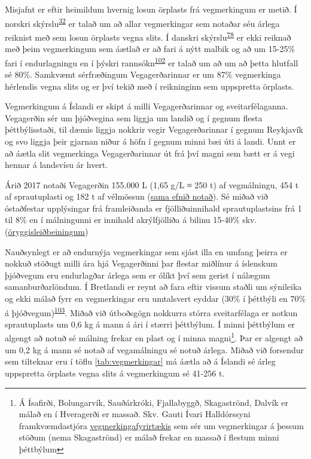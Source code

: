 \documentclass[icelandic,]{book}
\let\rmarkdownfootnote\footnote%
\def\footnote{\protect\rmarkdownfootnote}
\begin{document}
Misjafnt er eftir heimildum hvernig losun örplasts frá vegmerkingum er metið. Í norskri skýrslu\textsuperscript{\protect\hyperlink{ref-sundt2014sources}{32}} er talað um að allar vegmerkingar sem notaðar séu árlega reiknist með sem losun örplasts vegna slits. Í danskri skýrslu\textsuperscript{\protect\hyperlink{ref-lassen2015microplastics}{78}} er ekki reiknað með þeim vegmerkingum sem áætlað er að fari á nýtt malbik og að um 15-25\% fari í endurlagningu en í þýskri rannsókn\textsuperscript{\protect\hyperlink{ref-Commission2009}{102}} er talað um að um að þetta hlutfall sé 80\%. Samkvæmt sérfræðingum Vegagerðarinnar er um 87\% vegmerkinga hérlendis vegna slits og er því tekið með í reikninginn sem uppspretta örplasts.

Vegmerkingum á Íslandi er skipt á milli Vegagerðarinnar og sveitarfélaganna. Vegagerðin sér um þjóðvegina sem liggja um landið og í gegnum flesta þéttbýlisstaði, til dæmis liggja nokkrir vegir Vegagerðarinnar í gegnum Reykjavík og svo liggja þeir gjarnan niður á höfn í gegnum minni bæi úti á landi. Unnt er að áætla slit vegmerkinga Vegagerðarinnar út frá því magni sem bætt er á vegi hennar á landsvísu ár hvert.

Árið 2017 notaði Vegagerðin 155.000 L (1,65 g/L ≈ 250 t) af vegmálningu, 454 t af sprautuplasti og 182 t af vélmössun (\href{https://www.geveko-markings.com/fileadmin/root/msds/Thermoplastics/ViaTherm/MSDS_ViaTherm_hydrocarbon_EN-GB.pdf}{sama efnið notað}). Sé miðað við óstaðfestar upplýsingar frá framleiðanda er fjölliðuinnihald sprautuplastsins frá 1 til 8\% en í málningunni er innihald akrýlfjölliða á bilinu 15-40\% skv.(\href{\%22/skjol/Mercalin\%20AQ\%20white\%206010\%20vatnsmálning\%20CLEANOSOL-3.pdf\%22}{öryggisleiðbeiningum})

Nauðsynlegt er að endurnýja vegmerkingar sem sjást illa en umfang þeirra er nokkuð stöðugt milli ára hjá Vegagerðinni þar flestar miðlínur á íslenskum þjóðvegum eru endurlagðar árlega sem er ólíkt því sem gerist í nálægum samanburðarlöndum. Í Bretlandi er reynt að fara eftir vissum staðli um sýnileika og ekki málað fyrr en vegmerkingar eru umtalsvert eyddar (30\% í þéttbýli en 70\% á þjóðvegum)\textsuperscript{\protect\hyperlink{ref-Hann2018}{103}}. Miðað við útboðsgögn nokkurra stórra sveitarfélaga er notkun sprautuplasts um 0,6 kg á mann á ári í stærri þéttbýlum. Í minni þéttbýlum er algengt að notuð sé málning frekar en plast og í minna magni\footnote{Á Ísafirði, Bolungarvík, Sauðárkróki, Fjallabyggð, Skagaströnd, Dalvík er málað en í Hveragerði er massað. Skv. Gauti Ívari Halldórssyni framkvæmdastjóra \href{http://www.bilastaedamalun.is/}{vegmerkingafyrirtækis} sem sér um vegmerkingar á þessum stöðum (nema Skagaströnd) er málað frekar en massað í flestum minni þéttbýlum}. Þar er algengt að um 0,2 kg á mann sé notað af vegamálningu sé notuð árlega. Miðað við forsendur sem tilteknar eru í töflu \ref{tab:vegmerkingar} má áætla að á Íslandi sé árleg uppspretta örplasts vegna slits á vegmerkingum sé 41-256 t.
\end{document}
